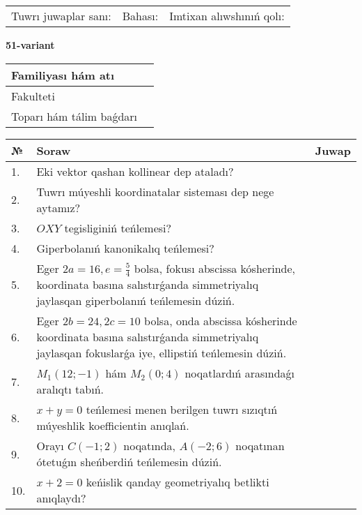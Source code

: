 \documentclass{article}
\begin{document}
\vspace{1cm}

\begin{tabular}{lll}
Tuwrı juwaplar sanı: \underline{\hspace{1.5cm}} & 
Bahası: \underline{\hspace{1.5cm}} & 
Imtixan alıwshınıń qolı: \underline{\hspace{2cm}} \\
\end{tabular}

\egroup

\newpage


\textbf{51-variant}\\

\bgroup
\def\arraystretch{1.6} %

\begin{tabular}{|m{5.7cm}|m{9.5cm}|}
\hline
Familiyası hám atı & \\
\hline
Fakulteti  & \\
\hline
Toparı hám tálim baǵdarı  & \\
\hline
\end{tabular}

\vspace{1cm}

\begin{tabular}{|m{0.7cm}|m{10cm}|m{4cm}|}
\hline
№ & Soraw & Juwap \\
\hline
1. & Eki vektor qashan kollinear dep ataladı? &  \\
\hline
2. & Tuwrı múyeshli koordinatalar sisteması dep nege aytamız? &  \\
\hline
3. & $OXY$ tegisliginiń teńlemesi? &  \\
\hline
4. & Giperbolanıń kanonikalıq teńlemesi? &  \\
\hline
5. & Eger $2a=16, e=\frac{5}{4}$ bolsa, fokusı abscissa kósherinde, koordinata basına salıstırǵanda simmetriyalıq jaylasqan giperbolanıń teńlemesin dúziń. &  \\
\hline
6. & Eger $2b=24, 2 c=10$ bolsa, onda abscissa kósherinde koordinata basına salıstırǵanda simmetriyalıq jaylasqan fokuslarǵa iye, ellipstiń teńlemesin dúziń. &  \\
\hline
7. & $M_{1} (12;-1)$ hám $M_{2} (0;4)$ noqatlardıń arasındaǵı aralıqtı tabıń. &  \\
\hline
8. & $x+y=0$ teńlemesi menen berilgen tuwrı sızıqtıń múyeshlik koefficientin anıqlań. &  \\
\hline
9. & Orayı $C (-1;2)$ noqatında, $A (-2;6 )$ noqatınan ótetuǵın sheńberdiń teńlemesin dúziń. &  \\
\hline
10. & $x+2=0$ keńislik qanday geometriyalıq betlikti anıqlaydı? &  \\
\hline
\end{tabular}
\end{document}
